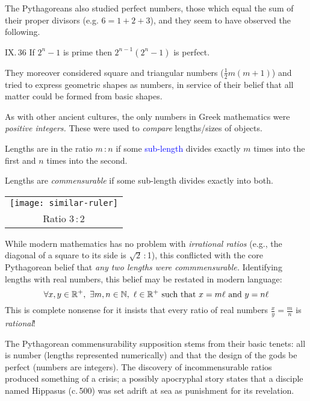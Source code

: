 The Pythagoreans also studied perfect numbers, those which equal the sum of their proper divisors (e.g. $6=1+2+3$), and they seem to have observed the following.

\begin{thm*}{IX.\,36}{}
	If $2^n-1$ is prime then $2^{n-1}(2^n-1)$ is perfect.
\end{thm*}

They moreover considered square and triangular numbers ($\frac 12m(m+1)$) and tried to express geometric shapes as numbers, in service of their belief that all matter could be formed from basic shapes.%
\vspace{-5pt}




As with other ancient cultures, the only numbers in Greek mathematics were \emph{positive integers.} These were used to \emph{compare} lengths/sizes of objects.

\begin{defn*}[lower separated=false, sidebyside, sidebyside align=top seam, sidebyside gap=0pt, righthand width=0.19\linewidth]{}{}
	Lengths are in the ratio $m$\,:\,$n$ if some \textcolor{blue}{sub-length} divides exactly $m$ times into the first and $n$ times into the second.\par
	Lengths are \emph{commensurable} if some sub-length divides exactly into both.
	\tcblower
	\flushright
	\begin{tabular}{c@{}}
		\texttt{[image: similar-ruler]}\\
		Ratio 3\,:\,2
	\end{tabular}
\end{defn*}

While modern mathematics has no problem with \emph{irrational ratios} (e.g., the diagonal of a square to its side is $\sqrt 2$\,:\,1), this conflicted with the core Pythagorean belief that \emph{any two lengths were commmensurable.} Identifying lengths with real numbers, this belief may be restated in modern language:
\[
	\forall x,y\in\R^+,\ \exists m,n\in\N,\ \ell\in\R^+\ \text{such that}\ x=m\ell\ \text{and}\ y=n\ell
\]
This is complete nonsense for it insists that every ratio of real numbers $\frac xy=\frac mn$ is \emph{rational}!\smallbreak

The Pythagorean commensurability supposition stems from their basic tenets: all is number (lengths represented numerically) and that the design of the gods be perfect (numbers are integers). The discovery of incommensurable ratios produced something of a crisis; a possibly apocryphal story states that a disciple named Hippasus (c.\,500\BC) was set adrift at sea as punishment for its revelation.\smallbreak %

